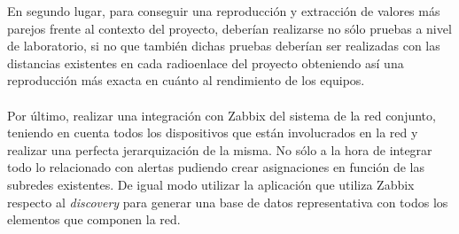 En segundo lugar, para conseguir una reproducción y extracción de valores más parejos frente al contexto del proyecto, deberían realizarse no sólo pruebas a nivel de laboratorio, si no que también dichas pruebas deberían ser realizadas con las distancias existentes en cada radioenlace del proyecto obteniendo así una reproducción más exacta en cuánto al rendimiento de los equipos.\\\\

Por último, realizar una integración con Zabbix del sistema de la red conjunto, teniendo en cuenta todos los dispositivos que están involucrados en la red y realizar una perfecta jerarquización de la misma. No sólo a la hora de integrar todo lo relacionado con alertas pudiendo crear asignaciones en función de las subredes existentes. De igual modo utilizar la aplicación que utiliza Zabbix respecto al \textit{discovery} para generar una base de datos representativa con todos los elementos que componen la red.